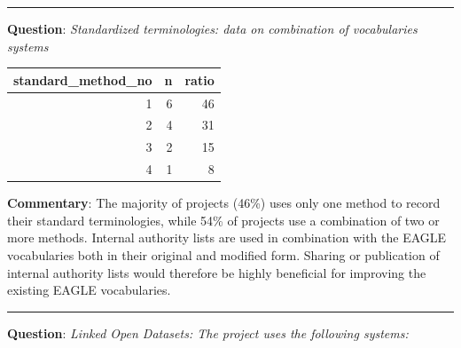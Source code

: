 \documentclass[
  12pt,
]{scrreprt}
\begin{document}
\begin{center}\rule{0.5\linewidth}{0.5pt}\end{center}

\textbf{Question}: \emph{Standardized terminologies: data on combination
of vocabularies systems}

\begin{longtable}[]{@{}rrr@{}}
\toprule
standard\_method\_no & n & ratio \\
\midrule
\endhead
1 & 6 & 46 \\
2 & 4 & 31 \\
3 & 2 & 15 \\
4 & 1 & 8 \\
\bottomrule
\end{longtable}

\textbf{Commentary}: The majority of projects (46\%) uses only one
method to record their standard terminologies, while 54\% of projects
use a combination of two or more methods. Internal authority lists are
used in combination with the EAGLE vocabularies both in their original
and modified form. Sharing or publication of internal authority lists
would therefore be highly beneficial for improving the existing EAGLE
vocabularies.

\begin{center}\rule{0.5\linewidth}{0.5pt}\end{center}

\textbf{Question}: \emph{Linked Open Datasets: The project uses the
following systems:}
\end{document}
